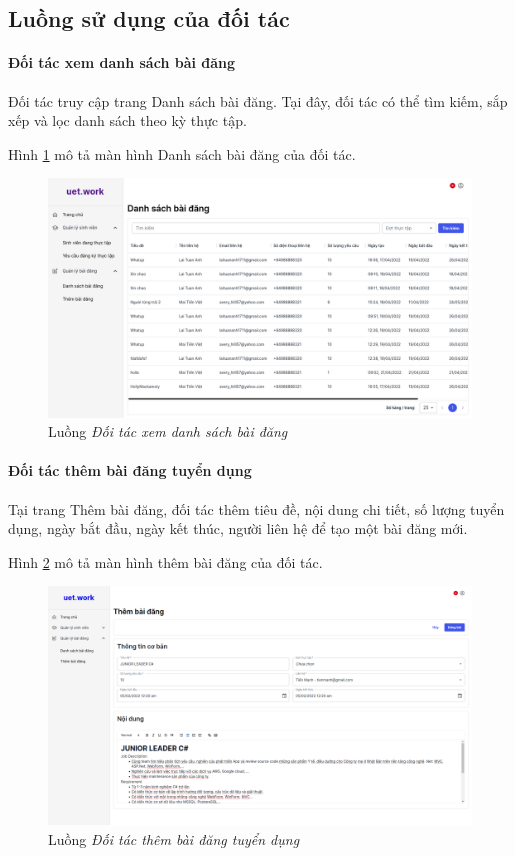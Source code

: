 \documentclass[./../main.tex]{subfiles}
\begin{document}
\subsection{Luồng sử dụng của đối tác}

\paragraph*{Đối tác xem danh sách bài đăng}

Đối tác truy cập trang Danh sách bài đăng. Tại đây, đối tác có thể tìm kiếm, sắp xếp và lọc danh sách theo kỳ thực tập.

Hình \ref{fig:partner_list_post_page} mô tả màn hình Danh sách bài đăng của đối tác.

\begin{figure}[]
	\includegraphics[width=\linewidth]{./images/list_post.png}
	\caption{Luồng \emph{Đối tác xem danh sách bài đăng}}
	\label{fig:partner_list_post_page}
\end{figure}

\paragraph*{Đối tác thêm bài đăng tuyển dụng}

Tại trang Thêm bài đăng, đối tác thêm tiêu đề, nội dung chi tiết, số lượng tuyển dụng, ngày bắt đầu, ngày kết thúc, người liên hệ để tạo một bài đăng mới.

Hình \ref{fig:add_post_page} mô tả màn hình thêm bài đăng của đối tác.

\begin{figure}[]
	\includegraphics[width=\linewidth]{./images/image18.png}
	\caption{Luồng \emph{Đối tác thêm bài đăng tuyển dụng}}
	\label{fig:add_post_page}
\end{figure}
\end{document}
